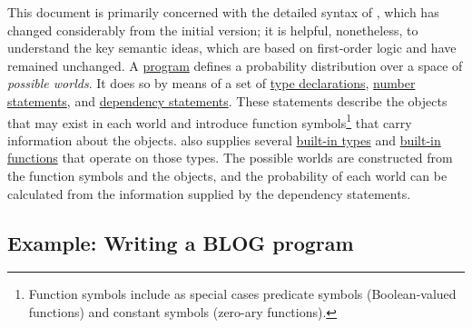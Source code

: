 \documentclass[12pt]{article}
\begin{document}
This document is primarily concerned with the detailed syntax of \bl, which has changed considerably from the initial version;
it is helpful, nonetheless, to understand the key semantic ideas, which are based on first-order logic and have remained unchanged.
A \bl \hyperref[program-section]{program} defines a probability distribution over a space of {\em possible worlds}.
It does so by means of a set of \hyperref[type-declaration-section]{type declarations},
\hyperref[number-section]{number statements}, and \hyperref[dependency-section]{dependency statements}.
These statements describe the objects that may exist in each world and introduce function symbols\footnote{Function symbols include as special cases predicate symbols (Boolean-valued functions) and constant symbols (zero-ary functions).} that carry information about the objects. \bl also supplies several \hyperref[builtin-type-section]{built-in types}
and \hyperref[builtin-operator-appendix]{built-in functions} that operate on those types.
The possible worlds are constructed from the function symbols and the objects,
and the probability of each world can be calculated from the information supplied by the dependency statements.

\subsection{Example: Writing a BLOG program}
\end{document}
